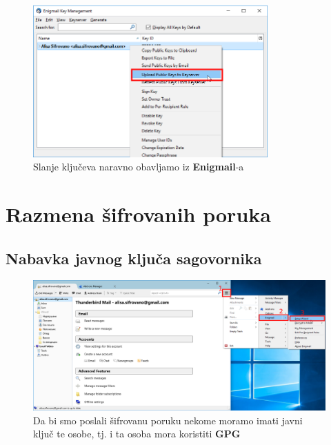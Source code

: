 \documentclass[a4paper,11pt]{article}
\begin{document}
\begin{figure}[!h]
	\begin{center}
		\includegraphics[width=9cm]{45_Enigmail_Key_Management.png}
		\caption{Slanje klju\v{c}eva naravno obavljamo iz \textbf{Enigmail}-a}
		\label{uploading_pubkey_enigmail2}
	\end{center}
\end{figure}
\newpage
\section{Razmena \v{s}ifrovanih poruka}
\subsection{Nabavka javnog klju\v{c}a sagovornika}

\begin{figure}[!h]
	\begin{center}
		\includegraphics[width=\textwidth]{44_Enigmail_Setup_Wizard.png}
		\caption{Da bi smo poslali \v{s}ifrovanu poruku nekome moramo imati javni klju\v{c} te osobe, tj. i ta osoba mora    koristiti \textbf{GPG}}
		\label{search_for_pubkey}
	\end{center}
\end{figure}
\end{document}
